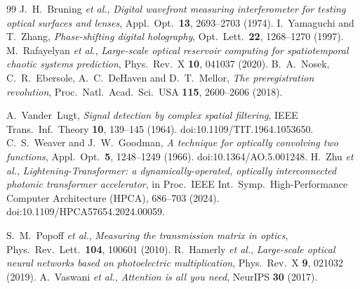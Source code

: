 \documentclass[11pt,a4paper]{article}
\begin{document}
\begin{thebibliography}{99}
 J.~H.~Bruning \emph{et al.},
  \emph{Digital wavefront measuring interferometer for testing optical
  surfaces and lenses}, Appl.\ Opt.\ \textbf{13}, 2693--2703 (1974).
 I.~Yamaguchi and T.~Zhang,
  \emph{Phase-shifting digital holography}, Opt.\ Lett.\ \textbf{22},
  1268--1270 (1997).
 M.~Rafayelyan \emph{et al.},
  \emph{Large-scale optical reservoir computing for spatiotemporal chaotic
  systems prediction}, Phys.\ Rev.\ X \textbf{10}, 041037 (2020).
 B.~A.~Nosek, C.~R.~Ebersole, A.~C.~DeHaven and D.~T.~Mellor,
  \emph{The preregistration revolution}, Proc.\ Natl.\ Acad.\ Sci.\ USA
  \textbf{115}, 2600--2606 (2018).

 A.~Vander~Lugt,
  \emph{Signal detection by complex spatial filtering}, IEEE Trans.\ Inf.\
  Theory \textbf{10}, 139--145 (1964). doi:10.1109/TIT.1964.1053650.
 C.~S.~Weaver and J.~W.~Goodman,
  \emph{A technique for optically convolving two functions}, Appl.\ Opt.\
  \textbf{5}, 1248--1249 (1966). doi:10.1364/AO.5.001248.
\bibitem{lightening} H.~Zhu \emph{et al.},
  \emph{Lightening-Transformer: a dynamically-operated, optically
  interconnected photonic transformer accelerator}, in Proc.\ IEEE Int.\ Symp.\
  High-Performance Computer Architecture (HPCA), 686--703 (2024).
  doi:10.1109/HPCA57654.2024.00059.

\bibitem{popoff} S.~M.~Popoff \emph{et al.},
  \emph{Measuring the transmission matrix in optics}, Phys.\ Rev.\ Lett.\
  \textbf{104}, 100601 (2010).
 R.~Hamerly \emph{et al.},
  \emph{Large-scale optical neural networks based on photoelectric
  multiplication}, Phys.\ Rev.\ X \textbf{9}, 021032 (2019).
\bibitem{attention} A.~Vaswani \emph{et al.},
  \emph{Attention is all you need}, NeurIPS \textbf{30} (2017).
\end{thebibliography}
\end{document}
